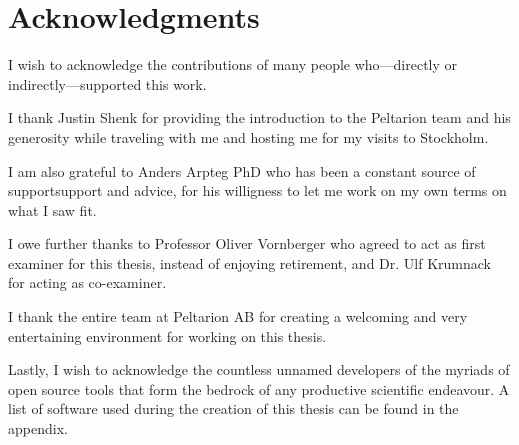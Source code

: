 \chapter*{Acknowledgments}

I wish to acknowledge the contributions of many people who---directly or
indirectly---supported this work.

I thank Justin Shenk for providing the introduction to the Peltarion team and his generosity while traveling with me and
hosting me for my visits to Stockholm.

I am also grateful to Anders Arpteg PhD who has been a constant source of
supportsupport and advice, for his willigness to let me work on my own terms on
what I saw fit.

I owe further thanks to Professor Oliver Vornberger who agreed to act as first examiner for this thesis, instead of
enjoying retirement, and Dr. Ulf Krumnack for acting as co-examiner.

I thank the entire team at Peltarion AB for creating a welcoming and very entertaining environment for working on this
thesis.

Lastly, I wish to acknowledge the countless unnamed developers of the myriads of open source tools that form the bedrock
of any productive scientific endeavour. A list of software used during the creation of this thesis can be found in the
appendix.
